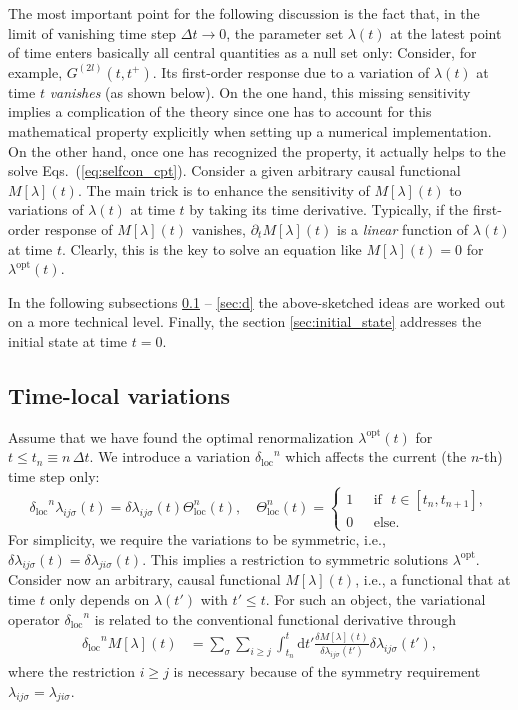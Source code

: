 \documentclass[twocolumn,prb,showpacs,aps,superscriptaddress]{revtex4}
\newcommand{\dt}[0]{\ensuremath{\mathrm{d}t}}
\newcommand{\deltaloc}[0]{\ensuremath{\delta_\mathrm{loc}}}
\begin{document}
The most important point for the following discussion is the fact that, in the limit of vanishing time step $\Delta t \to 0$, the parameter set $\lambda(t)$ at the latest point of time enters basically all central quantities as a null set only: 
Consider, for example, $G^{(2l)}(t,t^{+})$. 
Its first-order response due to a variation of $\lambda(t)$ at time $t$ {\em vanishes} (as shown below).
On the one hand, this missing sensitivity implies a complication of the theory since one has to account for this mathematical property explicitly when setting up a numerical implementation. 
On the other hand, once one has recognized the property, it actually helps to the solve Eqs.\ (\ref{eq:selfcon_cpt}). 
Consider a given arbitrary causal functional $M[\lambda](t)$. 
The main trick is to enhance the sensitivity of $M[\lambda](t)$ to variations of $\lambda(t)$ at time $t$ by taking its time derivative.
Typically, if the first-order response of $M[\lambda](t)$ vanishes, $\partial_{t}M[\lambda](t)$ is a {\em linear} function of $\lambda(t)$ at time $t$. 
Clearly, this is the key to solve an equation like $M[\lambda](t)=0$ for $\lambda^\text{opt}(t)$.

In the following subsections \ref{sec:a} -- \ref{sec:d} the above-sketched ideas are worked out on a more technical level. Finally, the section \ref{sec:initial_state} addresses the initial state at time $t=0$.

\subsection{Time-local variations}
\label{sec:a}

Assume that we have found the optimal renormalization $\lambda^\text{opt}(t)$
for $t \le t_n \equiv n \, \Delta t$. We introduce a variation $\deltaloc^n$
which affects the current (the $n$-th) time step only:
\begin{equation}
  \label{eq:defdeltan}
  \deltaloc^n \lambda_{ij\sigma}(t) = \delta\lambda_{ij\sigma}(t)
  \Theta^n_\mathrm{loc}(t), \quad
  \Theta^n_\mathrm{loc}(t)
  =
  \left\{
    \begin{aligned}
      1 \,\,\,\, &\text{if} \,\,\,\, {t \in \left[ t_n, t_{n+1}\right]},\\
      0 \,\,\,\, &\text{else}.
    \end{aligned}
  \right.
\end{equation}
For simplicity, we require the variations to be symmetric, i.e., $\delta
\lambda_{ij\sigma}(t) = \delta \lambda_{ji\sigma}(t)$. This implies a
restriction to symmetric solutions $\lambda^\text{opt}$. Consider now an
arbitrary, causal functional $M[\lambda](t)$, i.e., a functional that at time
$t$ only depends on $\lambda(t')$ with $t' \le t$. For such an object, the
variational operator $\deltaloc^n$ is related to the conventional functional
derivative through
\begin{align}
  \deltaloc^n M[\lambda](t) 
  &=
  \sum_{\sigma}\sum_{i \ge j}
  \int_{t_n}^t \dt'
  \frac{\delta M[\lambda](t)}{\delta \lambda_{ij\sigma}(t')}
  \delta\lambda_{ij\sigma}(t'),
\end{align}
where the restriction $i\ge j$ is necessary because of the symmetry requirement
$\lambda_{ij\sigma}=\lambda_{ji\sigma}$. 
\end{document}
